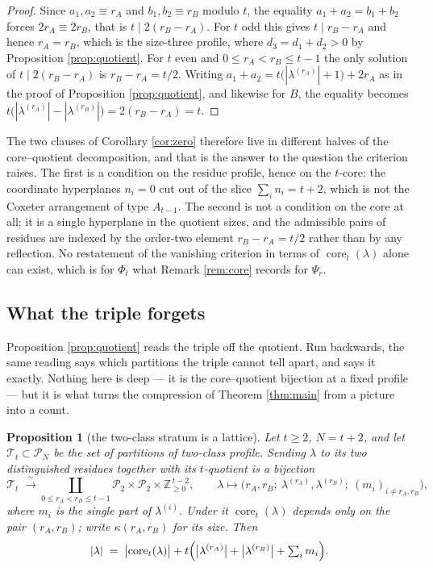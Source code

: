 \documentclass[11pt,reqno]{amsart}
\theoremstyle{plain}
\newtheorem{proposition}[theorem]{Proposition}
\theoremstyle{definition}
\newcommand{\ZZ}{\mathbb{Z}}
\newcommand{\PP}{\mathcal{P}}
\newcommand{\core}{\operatorname{core}}
\begin{document}
\begin{proof}
Since $a_1,a_2\equiv r_A$ and $b_1,b_2\equiv r_B$ modulo $t$, the equality $a_1+a_2=b_1+b_2$ forces
$2r_A\equiv2r_B$, that is $t\mid2(r_B-r_A)$. For $t$ odd this gives $t\mid r_B-r_A$ and hence
$r_A=r_B$, which is the size-three profile, where $d_3=d_1+d_2>0$ by Proposition
\ref{prop:quotient}. For $t$ even and $0\le r_A<r_B\le t-1$ the only solution of $t\mid2(r_B-r_A)$
is $r_B-r_A=t/2$. Writing $a_1+a_2=t\bigl(|\lambda^{(r_A)}|+1\bigr)+2r_A$ as in the proof of
Proposition \ref{prop:quotient}, and likewise for $B$, the equality becomes
$t\bigl(|\lambda^{(r_A)}|-|\lambda^{(r_B)}|\bigr)=2(r_B-r_A)=t$.
\end{proof}

The two clauses of Corollary \ref{cor:zero} therefore live in different halves of the
core--quotient decomposition, and that is the answer to the question the criterion raises. The first
is a condition on the residue profile, hence on the $t$-core: the coordinate hyperplanes $n_i=0$ cut
out of the slice $\sum_i n_i=t+2$, which is not the Coxeter arrangement of type $A_{t-1}$. The
second is not a condition on the core at all; it is a single hyperplane in the quotient sizes, and
the admissible pairs of residues are indexed by the order-two element $r_B-r_A=t/2$ rather than by
any reflection. No restatement of the vanishing criterion in terms of $\core_t(\lambda)$ alone can
exist, which is for $\Phi_t$ what Remark \ref{rem:core} records for $\Psi_r$.

\subsection{What the triple forgets}\label{sec:fibrelattice}
Proposition \ref{prop:quotient} reads the triple off the quotient. Run backwards, the same reading
says which partitions the triple cannot tell apart, and says it exactly. Nothing here is deep --- it
is the core--quotient bijection at a fixed profile --- but it is what turns the compression of
Theorem \ref{thm:main} from a picture into a count.

\begin{proposition}[the two-class stratum is a lattice]\label{prop:fibrelattice}
Let $t\ge2$, $N=t+2$, and let $\mathcal{T}_t\subset\PP_N$ be the set of partitions of two-class
profile. Sending $\lambda$ to its two distinguished residues together with its $t$-quotient is a
bijection
\begin{equation}\label{eq:fibrelattice}
\mathcal{T}_t\;\xrightarrow{\ \sim\ }\!\!\!\coprod_{0\le r_A<r_B\le t-1}\!\!\!
\PP_2\times\PP_2\times\ZZ_{\ge0}^{\,t-2},
\qquad
\lambda\longmapsto\bigl(r_A,r_B;\ \lambda^{(r_A)},\lambda^{(r_B)};\ (m_i)_{i\ne r_A,r_B}\bigr),
\end{equation}
where $m_i$ is the single part of $\lambda^{(i)}$. Under it $\core_t(\lambda)$ depends only on the
pair $(r_A,r_B)$; write $\kappa(r_A,r_B)$ for its size. Then
\begin{equation}\label{eq:sizelattice}
|\lambda|\;=\;\bigl|\core_t(\lambda)\bigr|
+t\Bigl(\bigl|\lambda^{(r_A)}\bigr|+\bigl|\lambda^{(r_B)}\bigr|+\textstyle\sum_i m_i\Bigr).
\end{equation}
\end{proposition}
\end{document}
